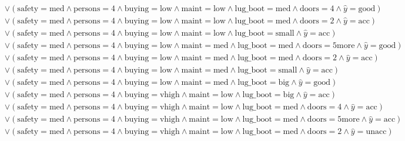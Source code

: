 \begin{scriptsize}
\[\begin{aligned}
  \\ & \lor (\text{safety}=\text{med} \land \text{persons}=\text{4} \land \text{buying}=\text{low} \land \text{maint}=\text{low} \land \text{lug_boot}=\text{med} \land \text{doors}=\text{4} \land \hat{y}=\text{good})
  \\ & \lor (\text{safety}=\text{med} \land \text{persons}=\text{4} \land \text{buying}=\text{low} \land \text{maint}=\text{low} \land \text{lug_boot}=\text{med} \land \text{doors}=\text{2} \land \hat{y}=\text{acc})
  \\ & \lor (\text{safety}=\text{med} \land \text{persons}=\text{4} \land \text{buying}=\text{low} \land \text{maint}=\text{low} \land \text{lug_boot}=\text{small} \land \hat{y}=\text{acc})
  \\ & \lor (\text{safety}=\text{med} \land \text{persons}=\text{4} \land \text{buying}=\text{low} \land \text{maint}=\text{med} \land \text{lug_boot}=\text{med} \land \text{doors}=\text{5more} \land \hat{y}=\text{good})
  \\ & \lor (\text{safety}=\text{med} \land \text{persons}=\text{4} \land \text{buying}=\text{low} \land \text{maint}=\text{med} \land \text{lug_boot}=\text{med} \land \text{doors}=\text{2} \land \hat{y}=\text{acc})
  \\ & \lor (\text{safety}=\text{med} \land \text{persons}=\text{4} \land \text{buying}=\text{low} \land \text{maint}=\text{med} \land \text{lug_boot}=\text{small} \land \hat{y}=\text{acc})
  \\ & \lor (\text{safety}=\text{med} \land \text{persons}=\text{4} \land \text{buying}=\text{low} \land \text{maint}=\text{med} \land \text{lug_boot}=\text{big} \land \hat{y}=\text{good})
  \\ & \lor (\text{safety}=\text{med} \land \text{persons}=\text{4} \land \text{buying}=\text{vhigh} \land \text{maint}=\text{low} \land \text{lug_boot}=\text{big} \land \hat{y}=\text{acc})
  \\ & \lor (\text{safety}=\text{med} \land \text{persons}=\text{4} \land \text{buying}=\text{vhigh} \land \text{maint}=\text{low} \land \text{lug_boot}=\text{med} \land \text{doors}=\text{4} \land \hat{y}=\text{acc})
  \\ & \lor (\text{safety}=\text{med} \land \text{persons}=\text{4} \land \text{buying}=\text{vhigh} \land \text{maint}=\text{low} \land \text{lug_boot}=\text{med} \land \text{doors}=\text{5more} \land \hat{y}=\text{acc})
  \\ & \lor (\text{safety}=\text{med} \land \text{persons}=\text{4} \land \text{buying}=\text{vhigh} \land \text{maint}=\text{low} \land \text{lug_boot}=\text{med} \land \text{doors}=\text{2} \land \hat{y}=\text{unacc})

\end{aligned}\]
\end{scriptsize}
